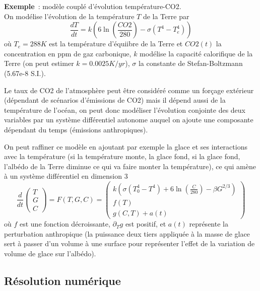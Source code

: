 \documentclass[a4paper,11pt]{article}
\begin{document}
\begin{giacjshere}
{\bf Exemple}~: mod\`ele coupl\'e d'\'evolution temp\'erature-CO2.\\
On mod\'elise l'\'evolution de la temp\'erature
$T$ de la Terre par
\[ \frac{dT}{dt} = k \left( 6 \ln (\frac{CO2}{280}) - \sigma (T^4-T_e^4) \right)\]
o\`u $T_e=288K$ est la temp\'erature d'\'equiibre de la Terre et 
$CO2(t)$ la concentration en ppm de gaz carbonique, $k$ mod\'elise
la capacit\'e calorifique de la Terre (on peut estimer $k=0.0025K/yr$),
$\sigma$ la constante de Stefan-Boltzmann (5.67e-8 S.I.).

Le taux de CO2 de l'atmosph\`ere peut \^etre consid\'er\'e comme
un for\c{c}age ext\'erieur (d\'ependant de sc\'enarios d'\'emissions
de CO2) mais il d\'epend aussi de la temp\'erature de l'oc\'ean,
on peut donc mod\'eliser l'\'evolution conjointe des deux
variables par un syst\`eme diff\'erentiel autonome auquel on
ajoute une composante d\'ependant du temps (\'emissions
anthropiques).

On peut raffiner ce mod\`ele en ajoutant par exemple la glace
et ses interactions avec la temp\'erature (si la temp\'erature
monte, la glace fond, si la glace fond, l'alb\'edo de la Terre diminue
ce qui va faire monter la temp\'erature), ce qui am\`ene \`a un
syst\`eme diff\'erentiel en dimension 3
\[ \frac{d}{dt} \left(\begin{array}{c}
T \\
G \\
C
\end{array}\right) =
F(T,G,C) = \left(\begin{array}{c}
k (\sigma(T_0^4-T^4)+6 \ln(\frac{C}{280}) - \beta G^{2/3} ) \\
f(T) \\
g(C,T) + a(t)
\end{array}\right)
\]
o\`u $f$ est une fonction d\'ecroissante, $\partial_T g$ est positif,
et $a(t)$ repr\'esente la perturbation anthropique (la puissance deux
tiers appliqu\'ee \`a la masse de glace sert \`a passer d'un volume
\`a une surface pour repr\'esenter l'effet de la variation de volume
de glace sur l'alb\'edo).


\subsection{Résolution numérique}

\end{giacjshere}
\end{document}
